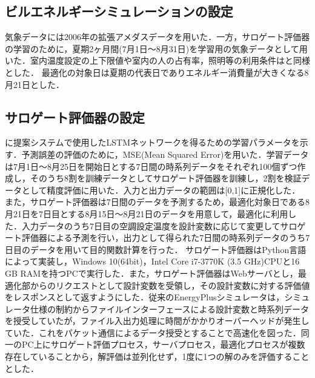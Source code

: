 \subsection{ビルエネルギーシミュレーションの設定}
気象データには2006年の拡張アメダスデータ\cite{Akasaka00}を用いた．一方，サロゲート評価器の学習のために，夏期2ヶ月間(7月1日～8月31日)を学習用の気象データとして用いた．室内温度設定の上下限値や室内の人の占有率，照明等の利用条件はと同様とした．
最適化の対象日は夏期の代表日でありエネルギー消費量が大きくなる8月21日とした．

\subsection{サロゲート評価器の設定}\label{subsec::surrogate_setting}
に提案システムで使用したLSTMネットワークを得るための学習パラメータを示す．予測誤差の評価のために，MSE(Mean Squared Error)を用いた．学習データは7月1日～8月25日を開始日とする7日間の時系列データをそれぞれ100個ずつ作成し，そのうち8割を訓練データとしてサロゲート評価器を訓練し，2割を検証データとして精度評価に用いた．入力と出力データの範囲は[0,1]に正規化した．
また，サロゲート評価器は7日間のデータを予測するため，最適化対象日である8月21日を7日目とする8月15日～8月21日のデータを用意して，最適化に利用した．入力データのうち7日目の空調設定温度を設計変数に応じて変更してサロゲート評価器による予測を行い，出力として得られた7日間の時系列データのうち7日目のデータを用いて目的関数計算を行った．
サロゲート評価器はPython言語によって実装し，Windows 10(64bit)，Intel Core i7-3770K (3.5 GHz)CPUと16 GB RAMを持つPCで実行した．また，サロゲート評価器はWebサーバとし，最適化部からのリクエストとして設計変数を受領し，その設計変数に対する評価値をレスポンスとして返すようにした．従来のEnergyPlusシミュレータは，シミュレータ仕様の制約からファイルインターフェースによる設計変数と時系列データを授受していたが，ファイル入出力処理に時間がかかりオーバーヘッドが発生していた．これをパケット通信によるデータ授受とすることで高速化を図った．同一のPC上にサロゲート評価プロセス，サーバプロセス，最適化プロセスが複数存在していることから，解評価は並列化せず，1度に1つの解のみを評価することとした．

